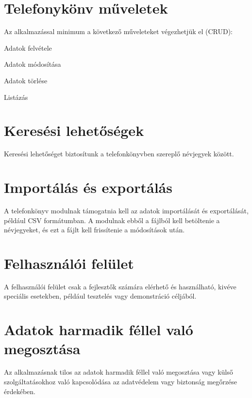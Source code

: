 \documentclass[11pt, letterpaper, openany, oneside]{book}
\begin{document}
\section{Telefonykönv műveletek}
Az alkalmazással minimum a következő műveleteket végezhetjük el (CRUD):

\vspace{5px}
\begin{compactitem}
    \item Adatok felvétele
    \item Adatok módosítása
    \item Adatok törlése
    \item Listázás
\end{compactitem}

\section{Keresési lehetőségek}
Keresési lehetőséget biztosítunk a telefonkönyvben szereplő névjegyek között.

\newpage

\section{Importálás és exportálás}
A telefonkönyv modulnak támogatnia kell az adatok importálását és exportálását, például CSV formátumban. A modulnak ebből a fájlból kell betöltenie a névjegyeket, és ezt a fájlt kell frissítenie a módosítások után.

\section{Felhasználói felület}
A felhasználói felület csak a fejlesztők számára elérhető és használható, kivéve speciális esetekben, például tesztelés vagy demonstráció céljából.

\section{Adatok harmadik féllel való megosztása}
Az alkalmazásnak tilos az adatok harmadik féllel való megosztása vagy külső szolgáltatásokhoz való kapcsolódása az adatvédelem vagy biztonság megőrzése érdekében.
\end{document}
